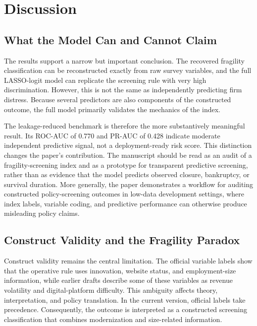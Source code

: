 \section{Discussion}

\subsection{What the Model Can and Cannot Claim}

The results support a narrow but important conclusion. The recovered fragility classification can be reconstructed exactly from raw survey variables, and the full LASSO-logit model can replicate the screening rule with very high discrimination. However, this is not the same as independently predicting firm distress. Because several predictors are also components of the constructed outcome, the full model primarily validates the mechanics of the index.

The leakage-reduced benchmark is therefore the more substantively meaningful result. Its ROC-AUC of 0.770 and PR-AUC of 0.428 indicate moderate independent predictive signal, not a deployment-ready risk score. This distinction changes the paper's contribution. The manuscript should be read as an audit of a fragility-screening index and as a prototype for transparent predictive screening, rather than as evidence that the model predicts observed closure, bankruptcy, or survival duration. More generally, the paper demonstrates a workflow for auditing constructed policy-screening outcomes in low-data development settings, where index labels, variable coding, and predictive performance can otherwise produce misleading policy claims.

\subsection{Construct Validity and the Fragility Paradox}

Construct validity remains the central limitation. The official variable labels show that the operative rule uses innovation, website status, and employment-size information, while earlier drafts describe some of these variables as revenue volatility and digital-platform difficulty. This ambiguity affects theory, interpretation, and policy translation. In the current version, official labels take precedence. Consequently, the outcome is interpreted as a constructed screening classification that combines modernization and size-related information.

